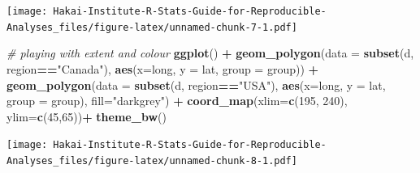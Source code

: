 \documentclass[]{book}
\newenvironment{Shaded}{\begin{snugshade}}{\end{snugshade}}
\newcommand{\KeywordTok}[1]{\textcolor[rgb]{0.13,0.29,0.53}{\textbf{#1}}}
\newcommand{\DataTypeTok}[1]{\textcolor[rgb]{0.13,0.29,0.53}{#1}}
\newcommand{\DecValTok}[1]{\textcolor[rgb]{0.00,0.00,0.81}{#1}}
\newcommand{\StringTok}[1]{\textcolor[rgb]{0.31,0.60,0.02}{#1}}
\newcommand{\CommentTok}[1]{\textcolor[rgb]{0.56,0.35,0.01}{\textit{#1}}}
\newcommand{\OperatorTok}[1]{\textcolor[rgb]{0.81,0.36,0.00}{\textbf{#1}}}
\newcommand{\NormalTok}[1]{#1}
\begin{document}
\texttt{[image: Hakai-Institute-R-Stats-Guide-for-Reproducible-Analyses\_files/figure-latex/unnamed-chunk-7-1.pdf]}

\begin{Shaded}
\begin{Highlighting}[]
\CommentTok{# playing with extent and colour}
\KeywordTok{ggplot}\NormalTok{() }\OperatorTok{+}\StringTok{ }
\StringTok{  }\KeywordTok{geom_polygon}\NormalTok{(}\DataTypeTok{data =} \KeywordTok{subset}\NormalTok{(d, region}\OperatorTok{==}\StringTok{"Canada"}\NormalTok{), }\KeywordTok{aes}\NormalTok{(}\DataTypeTok{x=}\NormalTok{long, }\DataTypeTok{y =}\NormalTok{ lat, }\DataTypeTok{group =}\NormalTok{ group)) }\OperatorTok{+}
\StringTok{  }\KeywordTok{geom_polygon}\NormalTok{(}\DataTypeTok{data =} \KeywordTok{subset}\NormalTok{(d, region}\OperatorTok{==}\StringTok{"USA"}\NormalTok{), }\KeywordTok{aes}\NormalTok{(}\DataTypeTok{x=}\NormalTok{long, }\DataTypeTok{y =}\NormalTok{ lat, }\DataTypeTok{group =}\NormalTok{ group), }\DataTypeTok{fill=}\StringTok{"darkgrey"}\NormalTok{) }\OperatorTok{+}
\StringTok{  }\KeywordTok{coord_map}\NormalTok{(}\DataTypeTok{xlim=}\KeywordTok{c}\NormalTok{(}\DecValTok{195}\NormalTok{, }\DecValTok{240}\NormalTok{), }\DataTypeTok{ylim=}\KeywordTok{c}\NormalTok{(}\DecValTok{45}\NormalTok{,}\DecValTok{65}\NormalTok{))}\OperatorTok{+}
\StringTok{  }\KeywordTok{theme_bw}\NormalTok{()}
\end{Highlighting}
\end{Shaded}

\texttt{[image: Hakai-Institute-R-Stats-Guide-for-Reproducible-Analyses\_files/figure-latex/unnamed-chunk-8-1.pdf]}
\end{document}
